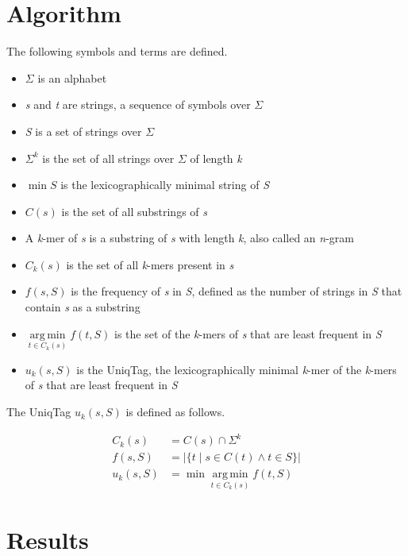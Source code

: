 \documentclass{bioinfo}
\begin{document}
\section{Algorithm}

The following symbols and terms are defined.

\begin{itemize}
\itemsep1pt\parskip0pt
\item
  $\Sigma$ is an alphabet
\item
  \emph{s} and \emph{t} are strings, a sequence of symbols over $\Sigma$
\item
  \emph{S} is a set of strings over $\Sigma$
\item
  $\Sigma^k$ is the set of all strings over $\Sigma$ of length \emph{k}
\item
  $\min S$ is the lexicographically minimal string of \emph{S}
\item
  $C(s)$ is the set of all substrings of \emph{s}
\item
  A \emph{k}-mer of \emph{s} is a substring of \emph{s} with length
  \emph{k}, also called an \emph{n}-gram
\item
  $C_k(s)$ is the set of all \emph{k}-mers present in \emph{s}
\item
  $f(s, S)$ is the frequency of \emph{s} in \emph{S}, defined as the
  number of strings in \emph{S} that contain \emph{s} as a substring
\item
  $\mathop{\arg\,\min}\limits_{t \in C_k(s)} f(t, S)$ is the set of the
  \emph{k}-mers of \emph{s} that are least frequent in \emph{S}
\item
  $u_k(s, S)$ is the UniqTag, the lexicographically minimal \emph{k}-mer
  of the \emph{k}-mers of \emph{s} that are least frequent in \emph{S}
\end{itemize}

\clearpage
The UniqTag $u_k(s, S)$ is defined as follows.

\[
\begin{aligned}
C_k(s) &= C(s) \cap \Sigma^k
\\ f(s, S) &= \left\vert \{ t \mid s \in C(t) \wedge t \in S \} \right\vert
\\ u_k(s, S) &= \min \mathop{\arg\,\min}\limits_{t \in C_k(s)} f(t, S)
\end{aligned}
\]

\section{Results}
\end{document}
